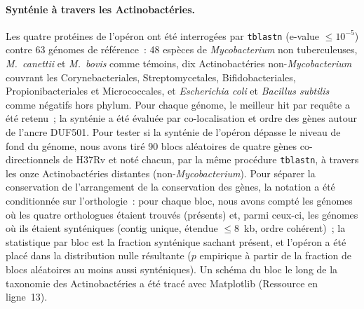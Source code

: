 \documentclass[11pt,a4paper]{article}
\begin{document}
\paragraph{Synténie à travers les Actinobactéries.} Les quatre protéines de l'opéron ont été interrogées par \texttt{tblastn} \citep{camacho2009blast} (e-value $\leq 10^{-5}$) contre 63 génomes de référence~: 48 espèces de \textit{Mycobacterium} non tuberculeuses, \textit{M.\ canettii} et \textit{M.\ bovis} comme témoins, dix Actinobactéries non-\textit{Mycobacterium} couvrant les Corynebacteriales, Streptomycetales, Bifidobacteriales, Propionibacteriales et Micrococcales, et \textit{Escherichia coli} et \textit{Bacillus subtilis} comme négatifs hors phylum. Pour chaque génome, le meilleur hit par requête a été retenu~; la synténie a été évaluée par co-localisation et ordre des gènes autour de l'ancre DUF501. Pour tester si la synténie de l'opéron dépasse le niveau de fond du génome, nous avons tiré 90 blocs aléatoires de quatre gènes co-directionnels de H37Rv et noté chacun, par la même procédure \texttt{tblastn}, à travers les onze Actinobactéries distantes (non-\textit{Mycobacterium}). Pour séparer la conservation de l'arrangement de la conservation des gènes, la notation a été conditionnée sur l'orthologie~: pour chaque bloc, nous avons compté les génomes où les quatre orthologues étaient trouvés (présents) et, parmi ceux-ci, les génomes où ils étaient synténiques (contig unique, étendue $\leq 8$~kb, ordre cohérent)~; la statistique par bloc est la fraction synténique sachant présent, et l'opéron a été placé dans la distribution nulle résultante ($p$ empirique à partir de la fraction de blocs aléatoires au moins aussi synténiques). Un schéma du bloc le long de la taxonomie des Actinobactéries a été tracé avec Matplotlib (Ressource en ligne~13).
\end{document}
